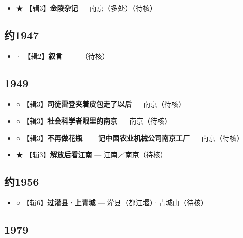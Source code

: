 \documentclass[UTF8,fontset=none,zihao=-4,a4paper]{ctexart}
\begin{document}
\begin{itemize}
\item ★ 【辑3】\textbf{金陵杂记} — 南京（多处）（待核）
\end{itemize}


\subsection{约1947}


\begin{itemize}
\item · 【辑2】\textbf{叙言} — —（待核）
\end{itemize}


\subsection{1949}


\begin{itemize}
\item ○ 【辑3】\textbf{司徒雷登夹着皮包走了以后} — 南京（待核）
\item ○ 【辑3】\textbf{社会科学者眼里的南京} — 南京（待核）
\item ○ 【辑3】\textbf{不再做花瓶——记中国农业机械公司南京工厂} — 南京（待核）
\item ★ 【辑3】\textbf{解放后看江南} — 江南／南京（待核）
\end{itemize}


\subsection{约1956}


\begin{itemize}
\item ○ 【辑6】\textbf{过灌县·上青城} — 灌县（都江堰）·青城山（待核）
\end{itemize}


\subsection{1979}
\end{document}
